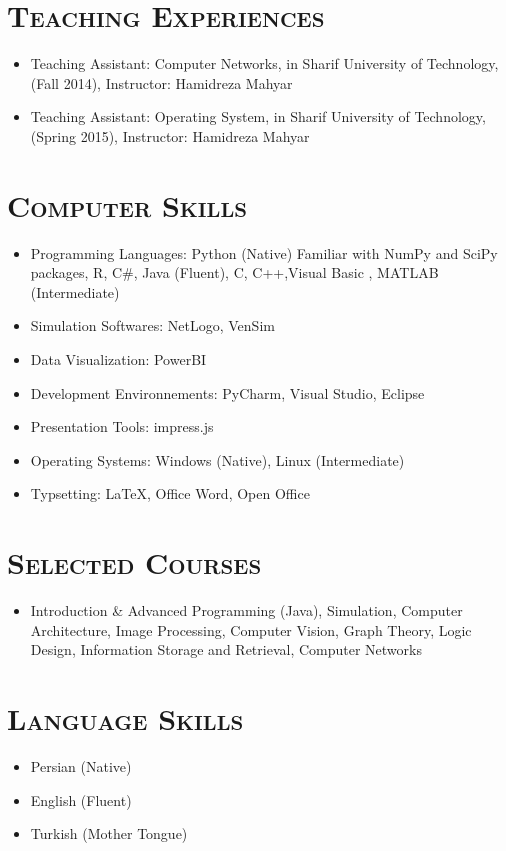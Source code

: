 \documentclass[line,margin]{res}
\begin{document}
\begin{resume}
\begin{spacing}{1.1}
\section{\textsc{Teaching Experiences}}
\begin{itemize}
\item  Teaching Assistant: Computer Networks, in Sharif University of Technology, (Fall 2014), Instructor:
Hamidreza Mahyar
\item Teaching Assistant: Operating System, in Sharif University of Technology, (Spring 2015), Instructor:
Hamidreza Mahyar
\end{itemize}

\section{\textsc{Computer
Skills}}
\begin{itemize}
\item  Programming Languages: Python (Native) Familiar with NumPy and SciPy packages, R, C\#, Java (Fluent), C, C++,Visual Basic , MATLAB (Intermediate)
\item Simulation Softwares: NetLogo, VenSim
\item Data Visualization: PowerBI
\item Development Environnements: PyCharm, Visual Studio, Eclipse
\item Presentation Tools: impress.js %
\item  Operating Systems: Windows (Native), Linux (Intermediate)
\item Typsetting: \LaTeX  , Office Word, Open Office
\end{itemize}

\section{\textsc{Selected Courses}}
\begin{itemize}
\item Introduction \& Advanced Programming (Java), Simulation, Computer Architecture, Image Processing, Computer Vision, 	Graph Theory, Logic Design, Information Storage and Retrieval, Computer Networks
\end{itemize}

\section{\textsc{Language Skills}}
\begin{itemize}
 \item Persian (Native)
\item English (Fluent)
\item Turkish (Mother Tongue)


\end{itemize}
\end{spacing}
\end{resume}
\end{document}
